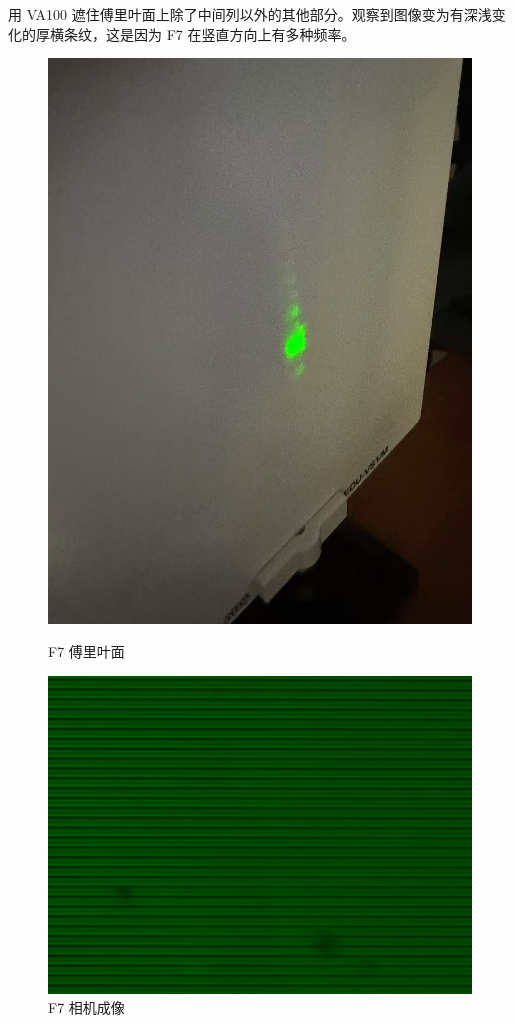 \documentclass{ctexart}
\begin{document}
用 VA100 遮住傅里叶面上除了中间列以外的其他部分。观察到图像变为有深浅变化的厚横条纹，这是因为 F7 在竖直方向上有多种频率。
\begin{figure}[H]
  \centering
  \begin{minipage}[b]{0.2\textwidth}
    \centering
    \includegraphics[width=\textwidth]{pictures/微信图片_20241017164815.jpg}
    \caption{F7 傅里叶面}
  \end{minipage}
  \hspace{0.1\textwidth} %
  \begin{minipage}[b]{0.3\textwidth}
    \centering
    \includegraphics[width=\textwidth]{pictures/F7-mask-Ex12.png}
    \caption{F7 相机成像}
  \end{minipage}
\end{figure}
\end{document}
